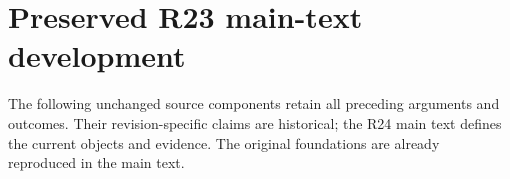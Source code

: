 \section{Preserved R23 main-text development}
The following unchanged source components retain all preceding arguments and outcomes. Their revision-specific claims are historical; the R24 main text defines the current objects and evidence. The original foundations are already reproduced in the main text.









